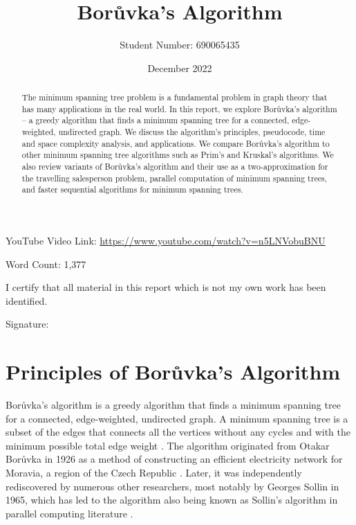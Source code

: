 \documentclass[a4paper, 11pt]{article}
\begin{document}
\title{Borůvka's Algorithm}
\author{Student Number: 690065435}
\date{December 2022}

\maketitle

\begin{abstract}
The minimum spanning tree problem is a fundamental problem in graph theory that has many applications in the real world. In this report, we explore Borůvka's algorithm -- a greedy algorithm that finds a minimum spanning tree for a connected, edge-weighted, undirected graph. We discuss the algorithm's principles, pseudocode, time and space complexity analysis, and applications. We compare Borůvka's algorithm to other minimum spanning tree algorithms such as Prim's and Kruskal's algorithms. We also review variants of Borůvka's algorithm and their use as a two-approximation for the travelling salesperson problem, parallel computation of minimum spanning trees, and faster sequential algorithms for minimum spanning trees.

\begin{center}
\end{center}
\end{abstract}

\vspace*{\fill}
\begin{center}
YouTube Video Link: \url{https://www.youtube.com/watch?v=n5LNVobuBNU}

\vspace{0.5em}
Word Count: 1,377

\vspace{1em}
I certify that all material in this report which is not my own work has been identified.
\end{center}
\vspace{1em}

Signature: \hrulefill

\newpage
\section{Principles of Borůvka's Algorithm}
Borůvka's algorithm is a greedy algorithm that finds a minimum spanning tree for a connected, edge-weighted, undirected graph. A minimum spanning tree is a subset of the edges that connects all the vertices without any cycles and with the minimum possible total edge weight \cite{graham1985history}. The algorithm originated from Otakar Borůvka in 1926 as a method of constructing an efficient electricity network for Moravia, a region of the Czech Republic \cite{nevsetvril2001otakar}. Later, it was independently rediscovered by numerous other researchers, most notably by Georges Sollin in 1965, which has led to the algorithm also being known as Sollin's algorithm in parallel computing literature \cite{sollin1965trace}. 
\end{document}
